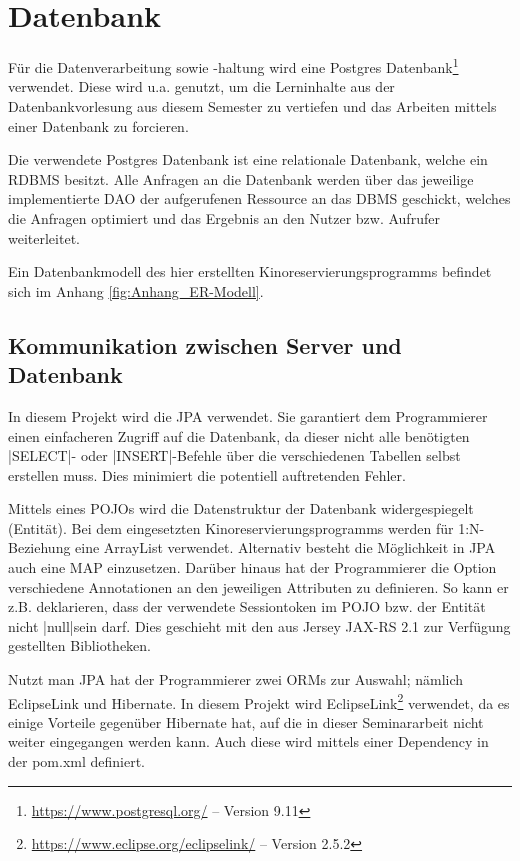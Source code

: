 \section{Datenbank}
\label{sec:datenbank}
\authorsection{\authorSG}

Für die Datenverarbeitung sowie -haltung wird eine Postgres Datenbank\footnote{\url{https://www.postgresql.org/} -- Version 9.11} verwendet.
Diese wird u.a. genutzt, um die Lerninhalte aus der Datenbankvorlesung aus diesem Semester zu vertiefen und das Arbeiten mittels einer Datenbank zu forcieren.

Die verwendete Postgres Datenbank ist eine relationale Datenbank, welche ein \acf{RDBMS} besitzt.
Alle Anfragen an die Datenbank werden über das jeweilige implementierte \acs{DAO} der aufgerufenen Ressource an das \acs{DBMS} geschickt, welches die Anfragen optimiert und das Ergebnis an den Nutzer bzw. Aufrufer weiterleitet.

Ein Datenbankmodell des hier erstellten Kinoreservierungsprogramms befindet sich im Anhang \vref{fig:Anhang_ER-Modell}. 

\subsection{Kommunikation zwischen Server und Datenbank}
\label{ssec:jpa}
\authorsection{\authorSG}

In diesem Projekt wird die \ac{JPA} verwendet.
Sie garantiert dem Programmierer einen einfacheren Zugriff auf die Datenbank, da dieser nicht alle benötigten \sinline |SELECT|- oder \sinline |INSERT|-Befehle über die verschiedenen Tabellen selbst erstellen muss.
Dies minimiert die potentiell auftretenden Fehler.

Mittels eines \acp{POJO} wird die Datenstruktur der Datenbank widergespiegelt (Entität). Bei dem eingesetzten Kinoreservierungsprogramms werden für 1:N-Beziehung eine ArrayList verwendet.
Alternativ besteht die Möglichkeit in \ac{JPA} auch eine MAP einzusetzen.
Darüber hinaus hat der Programmierer die Option verschiedene Annotationen an den jeweiligen Attributen zu definieren.
So kann er z.B. deklarieren, dass der verwendete Sessiontoken im \ac{POJO} bzw. der Entität nicht \jinline|null|sein darf.
Dies geschieht mit den aus Jersey JAX-RS 2.1 zur Verfügung gestellten Bibliotheken.

Nutzt man \ac{JPA} hat der Programmierer zwei \acp{ORM} zur Auswahl; nämlich EclipseLink und Hibernate.
In diesem Projekt wird EclipseLink\footnote{\url{https://www.eclipse.org/eclipselink/} -- Version 2.5.2} verwendet, da es einige Vorteile gegenüber Hibernate hat, auf die in dieser Seminararbeit nicht weiter eingegangen werden kann.
Auch diese wird mittels einer Dependency in der pom.xml definiert.

